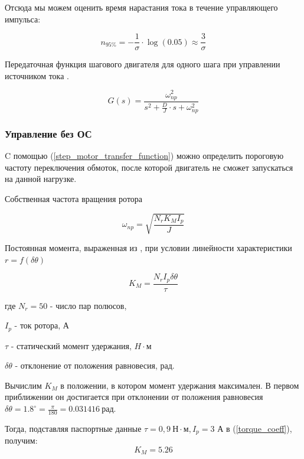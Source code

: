 Отсюда мы можем оценить время нарастания тока в течение управляющего импульса:

$$
    n_{ 95 \% } = - \frac{ 1 }{ \sigma }  \cdot \log{(0.05)} \approx \frac{ 3 }{ \sigma }
$$

Передаточная функция шагового двигателя для одного шага при управлении источником
тока \cite[гл. 4.2, ф-ла 4.65]{Kenio}.

\begin{equation}
    \label{step_motor_transfer_function}
    G(s) = \frac{ \omega_{np}^{2} }
                { s^{2} + \frac{D}{J} \cdot s + \omega_{np}^{2} }
\end{equation}

\newpage
\subsubsection{Управление без ОС}
C помощью (\ref{step_motor_transfer_function}) можно определить пороговую
частоту переключения обмоток, после которой двигатель не сможет запускаться на данной нагрузке.

Собственная частота вращения ротора \cite[гл. 4.2, ф-ла 4.48]{Kenio}

\begin{equation}
    \label{rotor_natural_frequency}
    \omega_{np} = \sqrt{\frac{N_{r}K_{M}I_{p}}{J}}
\end{equation}

Постоянная момента, выраженная из \cite[гл. 4.2, ф-ла 4.52]{Kenio}, при условии
линейности характеристики $r = f(\delta\theta)$

\begin{equation}
    \label{torque_coeff}
    K_{M} = \frac{N_{r}I_{p}\delta\theta}{\tau}
\end{equation}

где $N_{r} = 50$ - число пар полюсов,

$I_{p}$ - ток ротора, А

$\tau$ - статический момент удержания, $H \cdot \text{м}$

$\delta\theta$ - отклонение от положения равновесия, рад.
\newline

Вычислим $K_{M}$ в положении, в котором момент удержания максимален.
В первом приближении он достигается при отклонении от положения равновесия
$\delta\theta = 1.8^{\circ} = \frac{\pi}{180} = 0.031416 ~\text{рад}$.

Тогда, подставляя паспортные данные $\tau = 0,9 ~\text{Н} \cdot \text{м}, I_{p} = 3$ А
в (\ref{torque_coeff}), получим:
\begin{equation}
    \label{first_approximation_moment_coeff}
    K_{M} = 5.26
\end{equation}

